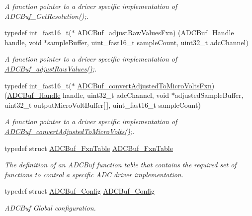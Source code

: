 \begin{DoxyCompactItemize}
\begin{DoxyCompactList}\small\item\em A function pointer to a driver specific implementation of A\+D\+C\+Buf\+\_\+\+Get\+Resolution();. \end{DoxyCompactList}\item 
typedef int\+\_\+fast16\+\_\+t($\ast$ \hyperlink{_a_d_c_buf_8h_a4a19f2deb010ca0ba5bdcf5586a8cb28}{A\+D\+C\+Buf\+\_\+adjust\+Raw\+Values\+Fxn}) (\hyperlink{_a_d_c_buf_8h_a9b9646efcf7a7fd38a2935abd940cf96}{A\+D\+C\+Buf\+\_\+\+Handle} handle, void $\ast$sample\+Buffer, uint\+\_\+fast16\+\_\+t sample\+Count, uint32\+\_\+t adc\+Channel)
\begin{DoxyCompactList}\small\item\em A function pointer to a driver specific implementation of \hyperlink{_a_d_c_buf_8h_a6967c459b64a71b344bd88eb7fbaa097}{A\+D\+C\+Buf\+\_\+adjust\+Raw\+Values()};. \end{DoxyCompactList}\item 
typedef int\+\_\+fast16\+\_\+t($\ast$ \hyperlink{_a_d_c_buf_8h_a6ffaac5eaa1253f9b78bbaa6952e1162}{A\+D\+C\+Buf\+\_\+convert\+Adjusted\+To\+Micro\+Volts\+Fxn}) (\hyperlink{_a_d_c_buf_8h_a9b9646efcf7a7fd38a2935abd940cf96}{A\+D\+C\+Buf\+\_\+\+Handle} handle, uint32\+\_\+t adc\+Channel, void $\ast$adjusted\+Sample\+Buffer, uint32\+\_\+t output\+Micro\+Volt\+Buffer\mbox{[}$\,$\mbox{]}, uint\+\_\+fast16\+\_\+t sample\+Count)
\begin{DoxyCompactList}\small\item\em A function pointer to a driver specific implementation of \hyperlink{_a_d_c_buf_8h_ad0d8a8edbb43194a61d1284a10b02a8c}{A\+D\+C\+Buf\+\_\+convert\+Adjusted\+To\+Micro\+Volts()};. \end{DoxyCompactList}\item 
typedef struct \hyperlink{struct_a_d_c_buf___fxn_table}{A\+D\+C\+Buf\+\_\+\+Fxn\+Table} \hyperlink{_a_d_c_buf_8h_a622617414025f3735e241d4ee58c8f5a}{A\+D\+C\+Buf\+\_\+\+Fxn\+Table}
\begin{DoxyCompactList}\small\item\em The definition of an A\+D\+C\+Buf function table that contains the required set of functions to control a specific A\+D\+C driver implementation. \end{DoxyCompactList}\item 
typedef struct \hyperlink{struct_a_d_c_buf___config}{A\+D\+C\+Buf\+\_\+\+Config} \hyperlink{_a_d_c_buf_8h_a630c696a789e6c298dc97b960f72e3d1}{A\+D\+C\+Buf\+\_\+\+Config}
\begin{DoxyCompactList}\small\item\em A\+D\+C\+Buf Global configuration. \end{DoxyCompactList}\end{DoxyCompactItemize}
